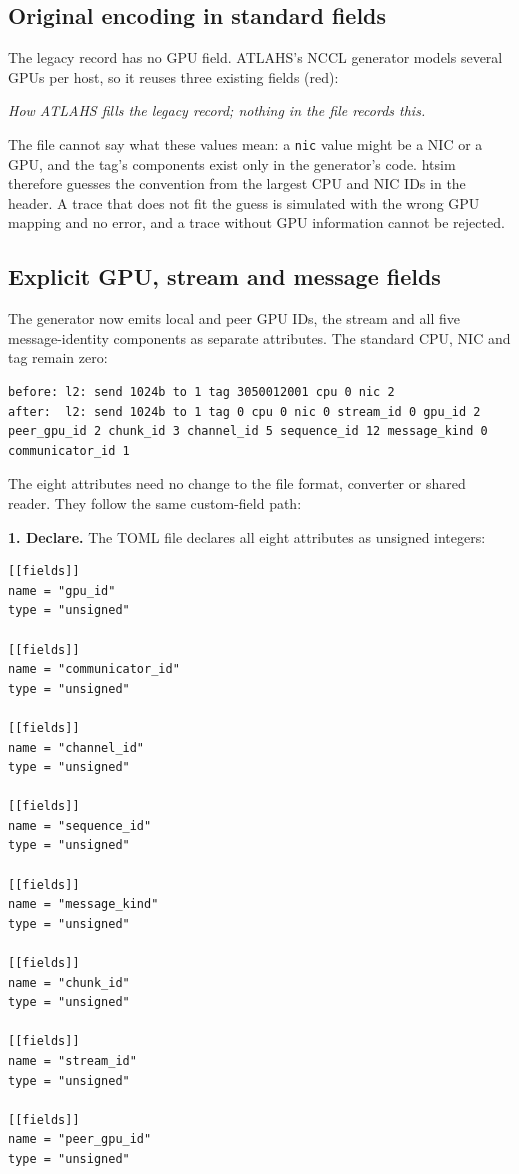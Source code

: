 \documentclass[10pt,a4paper]{article}
\begin{document}
\hypertarget{original-encoding-in-standard-fields}{}
\subsection{Original encoding in standard fields}

The legacy record has no GPU field. ATLAHS's NCCL generator models several GPUs per host, so it reuses three existing fields (red):

\begin{center}
\resizebox{\linewidth}{!}{}
\par\nopagebreak\small\itshape How ATLAHS fills the legacy record; nothing in the file records this.
\end{center}

The file cannot say what these values mean: a \texttt{nic} value might be a NIC or a GPU, and the tag's components exist only in the generator's code. htsim therefore guesses the convention from the largest CPU and NIC IDs in the header. A trace that does not fit the guess is simulated with the wrong GPU mapping and no error, and a trace without GPU information cannot be rejected.

\hypertarget{explicit-gpu-stream-and-message-fields}{}
\subsection{Explicit GPU, stream and message fields}

The generator now emits local and peer GPU IDs, the stream and all five message-identity components as separate attributes. The standard CPU, NIC and tag remain zero:

\begin{lstlisting}
before: l2: send 1024b to 1 tag 3050012001 cpu 0 nic 2
after:  l2: send 1024b to 1 tag 0 cpu 0 nic 0 stream_id 0 gpu_id 2 peer_gpu_id 2 chunk_id 3 channel_id 5 sequence_id 12 message_kind 0 communicator_id 1
\end{lstlisting}

The eight attributes need no change to the file format, converter or shared reader. They follow the same custom-field path:

\textbf{1. Declare.} The TOML file declares all eight attributes as unsigned integers:

\begin{lstlisting}
[[fields]]
name = "gpu_id"
type = "unsigned"

[[fields]]
name = "communicator_id"
type = "unsigned"

[[fields]]
name = "channel_id"
type = "unsigned"

[[fields]]
name = "sequence_id"
type = "unsigned"

[[fields]]
name = "message_kind"
type = "unsigned"

[[fields]]
name = "chunk_id"
type = "unsigned"

[[fields]]
name = "stream_id"
type = "unsigned"

[[fields]]
name = "peer_gpu_id"
type = "unsigned"
\end{lstlisting}
\end{document}
